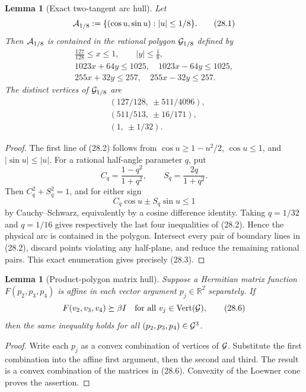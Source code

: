 \documentclass[11pt,oneside]{article}
\newtheorem{lemma}[theorem]{Lemma}
\theoremstyle{definition}
\theoremstyle{remark}
\begin{document}
\begin{lemma}[Exact two-tangent arc hull]
\label{lem:newv28-arc-hull}
Let
\[
 {\cal A}_{1/8}:=
 \{(\cos u,\sin u):|u|\le1/8\}.                          \tag{28.1}
\]
Then \({\cal A}_{1/8}\) is contained in the rational polygon
\({\cal G}_{1/8}\) defined by
\[
\begin{gathered}
 \frac{127}{128}\le x\le1,\qquad |y|\le\frac18,\\
 1023x+64y\le1025,\quad 1023x-64y\le1025,\\
 255x+32y\le257,\quad 255x-32y\le257.                   \tag{28.2}
\end{gathered}
\]
The distinct vertices of \({\cal G}_{1/8}\) are
\[
\begin{split}
 &(127/128,\ \pm511/4096),\\
 &(511/513,\ \pm16/171),\\
 &(1,\ \pm1/32).
\end{split}                                             \tag{28.3}
\]
\end{lemma}

\begin{proof}
The first line of (28.2) follows from
\(\cos u\ge1-u^2/2\), \(\cos u\le1\), and
\(|\sin u|\le|u|\).  For a rational half-angle parameter \(q\), put
\[
 C_q=\frac{1-q^2}{1+q^2},\qquad
 S_q=\frac{2q}{1+q^2}.                                  \tag{28.4}
\]
Then \(C_q^2+S_q^2=1\), and for either sign
\[
 C_q\cos u\pm S_q\sin u\le1                             \tag{28.5}
\]
by Cauchy--Schwarz, equivalently by a cosine difference identity.
Taking \(q=1/32\) and \(q=1/16\) gives respectively the last four
inequalities of (28.2).  Hence the physical arc is contained in the
polygon.  Intersect every pair of boundary lines in (28.2), discard
points violating any half-plane, and reduce the remaining rational
pairs.  This exact enumeration gives precisely (28.3).
\end{proof}

\begin{lemma}[Product-polygon matrix hull]
\label{lem:newv28-product-hull}
Suppose a Hermitian matrix function \(F(p_2,p_3,p_4)\) is affine in
each vector argument \(p_j\in\mathbb R^2\) separately.  If
\[
 F(v_2,v_3,v_4)\succeq\beta I
 \quad\text{for all }v_j\in\operatorname{Vert}({\cal G}),\tag{28.6}
\]
then the same inequality holds for all
\((p_2,p_3,p_4)\in{\cal G}^3\).
\end{lemma}

\begin{proof}
Write each \(p_j\) as a convex combination of vertices of
\({\cal G}\).  Substitute the first combination into the affine
first argument, then the second and third.  The result is a convex
combination of the matrices in (28.6).  Convexity of the Loewner
cone proves the assertion.
\end{proof}
\end{document}
